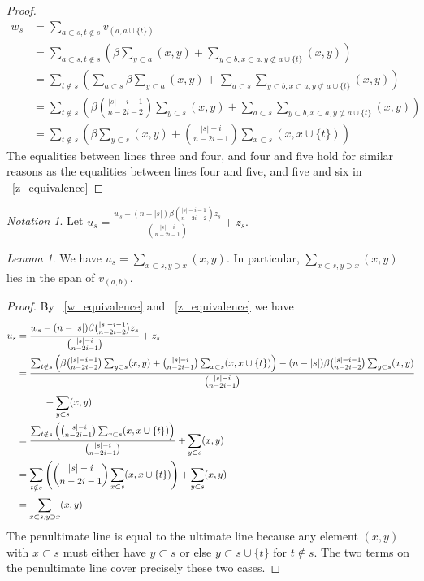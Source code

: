 \documentclass[10 pt]{amsart}
\theoremstyle{plain}
\theoremstyle{definition}
\theoremstyle{remark}
\numberwithin{equation}{section}
\newtheorem{lem}[thm]{Lemma}
\theoremstyle{remark}
\newtheorem{note}[thm]{Notation}
\begin{document}
\begin{proof}
\begin{align*}
	w_s &= \sum_{a \subset s,t\notin s}^{}v_{(a, a \cup \{t\})}\\
	&= \sum_{a \subset s,t\notin s}^{}\left(\beta \sum_{y \subset a}^{}(x, y) + \sum_{y\subset b,x \subset a,y\not\subset a \cup \{t\}}^{}(x, y) \right)\\
	&= \sum_{t\notin s}^{}\left(\sum_{a \subset s}^{}\beta \sum_{y \subset a}^{}(x, y) + \sum_{a \subset s}^{}\sum_{y\subset b,x \subset a,y\not\subset a \cup \{t\}}^{}(x, y) \right)\\
	&=\sum_{t\notin s}^{}\left(\beta \binom {|s|-i-1}{n-2i-2}\sum_{y \subset s}^{}(x, y) + \sum_{a \subset s}^{}\sum_{y\subset b,x \subset a,y\not\subset a \cup \{t\}}^{}(x, y) \right)\\
	&=\sum_{t\notin s}^{} \left(\beta \sum_{y \subset s}^{}(x, y) + \binom {|s|-i}{n-2i-1}\sum_{x \subset s}^{}(x, x \cup \{t\}) \right)
\end{align*}
The equalities between lines three and four, and four and five hold for similar reasons as the equalities between lines four and five, and five and six in ~\ref{z_equivalence}
\end{proof}

\begin{note}
Let $u_s = \frac{w_s - (n - |s|)\beta \binom {|s|-i-1}{n-2i-2} z_s}{\binom {|s|-i}{n-2i-1}} + z_s.$
\end{note}

\begin{lem}
\label{u_equivalence}
We have $u_s = \sum_{x\subset s,y\supset x}^{}(x, y).$ In particular, $\sum_{x\subset s,y\supset x}^{}(x, y)$ lies in the span of $v_{(a, b)}.$
\end{lem}
\begin{proof}
By ~\ref{w_equivalence} and ~\ref{z_equivalence} we have
\begin{align*}
	u_s &= \frac{w_s - (n - |s|)\beta \binom {|s|-i-1}{n-2i-2} z_s}{\binom {|s|-i}{n-2i-1}} + z_s\\
	&= \frac{\sum_{t\notin s}^{} \left(\beta \binom {|s|-i-1}{n-2i-2}\sum_{y \subset s}^{}(x, y) + \binom {|s|-i}{n-2i-1}\sum_{x \subset s}^{}(x, x \cup \{t\}) \right) - (n - |s|)\beta \binom {|s|-i-1}{n-2i-2} \sum_{y \subset s}^{}(x, y)}{\binom {|s|-i}{n-2i-1}} 
	\\
	& \hspace{1 cm}+ \sum_{y \subset s}^{}(x, y) \\
	&=  \frac{\sum_{t\notin s}^{} \left(\binom {|s|-i}{n-2i-1}\sum_{x \subset s}^{}(x, x \cup \{t\}) \right)}{\binom {|s|-i}{n-2i-1}} + \sum_{y \subset s}^{}(x, y) \\
	&= \sum_{t\notin s}^{} \left(\binom {|s|-i}{n-2i-1}\sum_{x \subset s}^{}(x, x \cup \{t\}) \right) + \sum_{y \subset s}^{}(x, y) \\
	&=  \sum_{x\subset s,y\supset x}^{}(x, y)
\end{align*}
The penultimate line is equal to the ultimate line because any element $(x, y)$ with $x \subset s$ must either have $y \subset s$ or else $y \subset s \cup \{t\}$ for $t \notin s.$ The two terms on the penultimate line cover precisely these two cases.
\end{proof}
\end{document}

